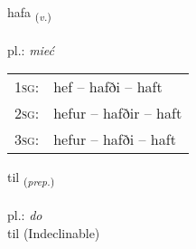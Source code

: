 \documentclass[frontgrid, backgrid]{flacards}\usepackage[]{graphicx}\usepackage[]{xcolor}
\begin{document}
\renewcommand{\blhead}{\vskip5pt {\small\bfseries\footnotesize Sagnorð | Verb }}
\renewcommand{\bcfoot}{\vskip5pt \hspace{2pt}{\small\bfseries\footnotesize 1K}}


{hafa \small{\textsubscript{(\textit{v.})}} \\[1ex] %
\textphonetic{[haːva]} \\
pl.: \emph{mieć} \\  [2ex]
\renewcommand*{\arraystretch}{0.8}
\begin{tabular}{p{1cm}l}
\textsc{1sg}: & hef -- hafði -- haft \\ 
\textsc{2sg}: & hefur -- hafðir -- haft \\ 
\textsc{3sg}: & hefur -- hafði -- haft \\ 
\end{tabular}
}


\renewcommand{\flhead}{\vskip5pt \fboxsep=0pt {\small\bfseries\footnotesize Forsetning | Preposition}}
\renewcommand{\fcfoot}{\vskip5pt \fboxsep=0pt \hspace{2pt}{\small\bfseries\footnotesize 1K}}

\renewcommand{\blhead}{\vskip5pt {\small\bfseries\footnotesize Forsetning | Preposition }}
\renewcommand{\bcfoot}{\vskip5pt \hspace{2pt}{\small\bfseries\footnotesize 1K}}


{til \small{\textsubscript{(\textit{prep.})}} \\[1ex]
\textphonetic{[tʰɪːl]} \\
pl.: \emph{do} \\  [2ex]
til (Indeclinable)}

\renewcommand{\flhead}{\vskip5pt \fboxsep=0pt {\small\bfseries\footnotesize Fornafn | Pronoun}}
\renewcommand{\fcfoot}{\vskip5pt \fboxsep=0pt \hspace{2pt}{\small\bfseries\footnotesize 1K}}

\renewcommand{\blhead}{\vskip5pt {\small\bfseries\footnotesize Fornafn | Pronoun }}
\renewcommand{\bcfoot}{\vskip5pt \hspace{2pt}{\small\bfseries\footnotesize 1K}}
\end{document}
